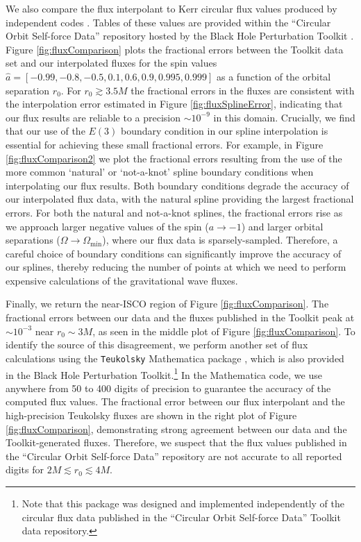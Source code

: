 \documentclass[%
 reprint,
 nofootinbib,
 amsmath,amssymb,
 aps,
 prd,
]{revtex4-2}
\begin{document}
We also compare the flux interpolant to Kerr circular flux values produced by independent codes \cite{TaraETC14, GralHughWarb16}. Tables of these values are provided within the ``Circular Orbit Self-force Data'' repository hosted by the Black Hole Perturbation Toolkit \cite{BHPTK18}. Figure \ref{fig:fluxComparison} plots the fractional errors between the Toolkit data set and our interpolated fluxes for the spin values $\hat{a} = [-0.99, -0.8, -0.5, 0.1, 0.6, 0.9, 0.995, 0.999]$ as a function of the orbital separation $r_0$. For $r_0 \gtrsim 3.5 M$ the fractional errors in the fluxes are consistent with the interpolation error estimated in Figure \ref{fig:fluxSplineError}, indicating that our flux results are reliable to a precision $\sim 10^{-9}$ in this domain. Crucially, we find that our use of the $E(3)$ boundary condition in our spline interpolation is essential for achieving these small fractional errors. For example, in Figure \ref{fig:fluxComparison2} we plot the fractional errors resulting from the use of the more common `natural' or `not-a-knot' spline boundary conditions when interpolating our flux results. Both boundary conditions degrade the accuracy of our interpolated flux data, with the natural spline providing the largest fractional errors. For both the natural and not-a-knot splines, the fractional errors rise as we approach larger negative values of the spin ($a \rightarrow -1$) and larger orbital separations ($\Omega \rightarrow \Omega_\mathrm{min}$), where our flux data is sparsely-sampled. Therefore, a careful choice of boundary conditions can significantly improve the accuracy of our splines, thereby reducing the number of points at which we need to perform expensive calculations of the gravitational wave fluxes.

Finally, we return the near-ISCO region of Figure \ref{fig:fluxComparison}. The fractional errors between our data and the fluxes published in the Toolkit peak at $\sim 10^{-3}$ near $r_0 \sim 3 M$, as seen in the middle plot of Figure \ref{fig:fluxComparison}. To identify the source of this disagreement, we perform another set of flux calculations using the \texttt{Teukolsky} Mathematica package \cite{BHPT_TEUK}, which is also provided in the Black Hole Perturbation Toolkit.\footnote{Note that this package was designed and implemented independently of the circular flux data published in the ``Circular Orbit Self-force Data'' Toolkit data repository.} In the Mathematica code, we use anywhere from 50 to 400 digits of precision to guarantee the accuracy of the computed flux values. The fractional error between our flux interpolant and the high-precision Teukolsky fluxes are shown in the right plot of Figure \ref{fig:fluxComparison}, demonstrating strong agreement between our data and the Toolkit-generated fluxes. Therefore, we suspect that the flux values published in the ``Circular Orbit Self-force Data'' repository are not accurate to all reported digits for $ 2M \lesssim r_0 \lesssim 4 M$.
\end{document}
